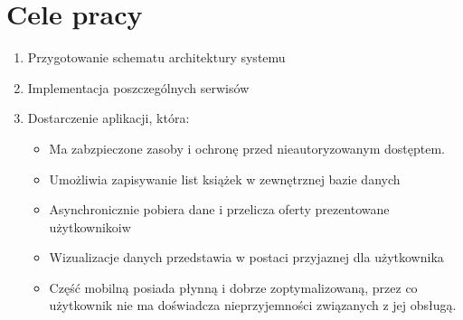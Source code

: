 
\section{Cele pracy}
\label{sec:celePracy}
\begin{enumerate}
    \item Przygotowanie schematu architektury systemu
    \item Implementacja poszczególnych serwisów
    \item Dostarczenie aplikacji, która: 
    \begin{itemize}
        \item Ma zabzpieczone zasoby i ochronę przed nieautoryzowanym dostęptem.
        \item Umożliwia zapisywanie list książek w zewnętrznej bazie danych 
        \item Asynchronicznie pobiera dane i przelicza oferty prezentowane użytkownikoiw
        \item Wizualizacje danych przedstawia w postaci przyjaznej dla użytkownika
        \item Część mobilną posiada płynną i dobrze zoptymalizowaną, przez co użytkownik nie ma doświadcza nieprzyjemności związanych z jej obsługą.
    \end{itemize}
\end{enumerate}


